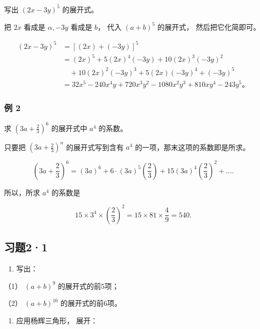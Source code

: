 写出 \((2x - 3y)^{5}\) 的展开式。


把 \(2x\) 看成是 \(\alpha, -3y\) 看成是 \(b\)， 代入 \((a + b)^{5}\)
的展开式， 然后把它化简即可。


\[
\begin{aligned}
(2x-3y)^5&=[(2x)+(-3y)]^5\\
&=(2x)^5+5(2x)^4(-3y)+10(2x)^3(-3y)^2\\
&\quad+10(2x)^2(-3y)^3+5(2x)(-3y)^4+(-3y)^5\\
&=32x^5-240x^4y+720x^3y^2-1080x^2y^3+810xy^4-243y^5\text{。}
\end{aligned}
\]

\subsubsection{例 2}

求 \(\left(3a + \frac{2}{3}\right)^6\) 的展开式中 \(a^4\) 的系数。

 只要把 \(\left(3a + \frac{2}{3}\right)^n\)
的展开式写到含有 \(a^4\) 的一项，那末这项的系数即是所求。


\[
\left(3 a + \frac {2}{3}\right) ^ {6} = (3 a) ^ {6} + 6 \cdot (3 a) ^ {5} \left(\frac {2}{3}\right) + 15 (3 a) ^ {4} \left(\frac {2}{3}\right) ^ {2} + \dots .
\]

所以，所求 \(a^4\) 的系数是

\[
15 \times 3 ^ {4} \times \left(\frac {2}{3}\right) ^ {2} = 15 \times 81 \times \frac {4}{9} = 540.
\]

\subsection{习题2·1}

\begin{enumerate}
\item
  写出：
\end{enumerate}

（1） \((a + b)^9\) 的展开式的前5项；

（2） \((a + b)^{10}\) 的展开式的前6项。

\begin{enumerate}[start=2]
\item
  应用杨辉三角形， 展开：
\end{enumerate}

